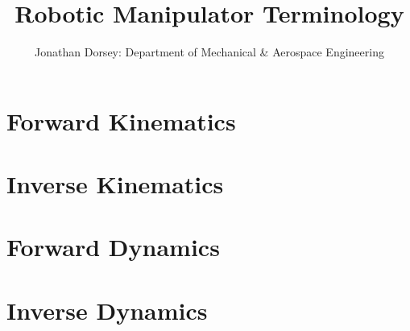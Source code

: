 \documentclass[12px]{article}
\begin{document}
    \title{Robotic Manipulator Terminology }

    \author{Jonathan Dorsey: Department of Mechanical \& Aerospace Engineering}

    \maketitle


    \section{Forward Kinematics}

    \section{Inverse Kinematics}

    \section{Forward Dynamics}
    
    \section{Inverse Dynamics}
\end{document}
